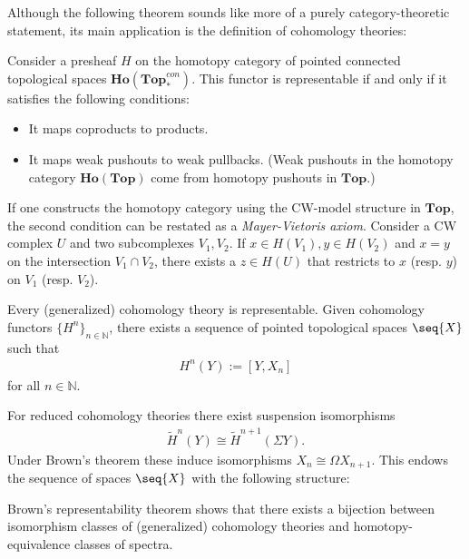     Although the following theorem sounds like more of a purely category-theoretic statement, its main application is the definition of cohomology theories:
    \begin{theorem}\label{topology:brown}
        Consider a presheaf $H$ on the homotopy category of pointed connected topological spaces $\mathbf{Ho}(\mathbf{Top}^{con}_*)$. This functor is representable if and only if it satisfies the following conditions:
        \begin{itemize}
            \item It maps coproducts to products.
            \item It maps weak pushouts to weak pullbacks. (Weak pushouts in the homotopy category $\mathbf{Ho}(\mathbf{Top})$ come from homotopy pushouts in $\mathbf{Top}$.)
        \end{itemize}
    \end{theorem}
    \begin{remark}
        If one constructs the homotopy category using the CW-model structure in $\mathbf{Top}$, the second condition can be restated as a \textit{Mayer-Vietoris axiom}. Consider a CW complex $U$ and two subcomplexes $V_1,V_2$. If $x\in H(V_1),y\in H(V_2)$ and $x=y$ on the intersection $V_1\cap V_2$, there exists a $z\in H(U)$ that restricts to $x$ (resp. $y$) on $V_1$ (resp. $V_2$).
    \end{remark}
    \begin{result}[Cohomology]
        Every (generalized) cohomology theory is representable. Given cohomology functors $\{H^n\}_{n\in\mathbb{N}}$, there exists a sequence of pointed topological spaces $\seq{X}$ such that
        \begin{gather}
            H^n(Y) := [Y,X_n]
        \end{gather}
        for all $n\in\mathbb{N}$.
    \end{result}

    For reduced cohomology theories there exist suspension isomorphisms
    \begin{gather}
        \widetilde{H}^n(Y)\cong\widetilde{H}^{n+1}(\Sigma Y).
    \end{gather}
    Under Brown's theorem these induce isomorphisms $X_n\cong\Omega X_{n+1}$. This endows the sequence of spaces $\seq{X}$ with the following structure:
    \begin{property}
        Brown's representability theorem shows that there exists a bijection between isomorphism classes of (generalized) cohomology theories and homotopy-equivalence classes of spectra.
    \end{property}

